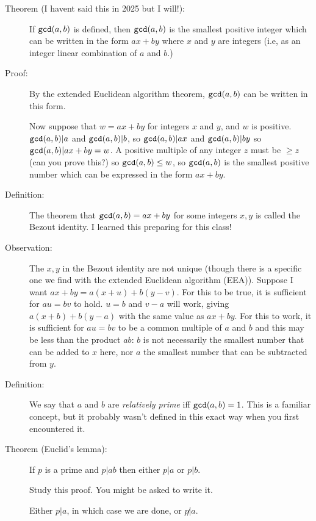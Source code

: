 \documentclass[12pt]{article}
\begin{document}
\begin{description}

\item[Theorem (I havent said this in 2025 but I will!):]  If ${\tt gcd}(a,b)$ is defined, then ${\tt gcd}(a,b)$ is the smallest positive integer which can be written in the form $ax+by$ where $x$ and $y$ are integers (i.e, as an integer linear combination of $a$ and $b$.)

\item[Proof:]  By the extended Euclidean algorithm theorem, ${\tt gcd}(a,b)$ can be written in this form.

Now suppose that $w=ax+by$ for integers $x$ and $y$, and $w$ is positive.  ${\tt gcd}(a,b)|a$ and ${\tt gcd}(a,b)|b$, so ${\tt gcd}(a,b)|ax$ and ${\tt gcd}(a,b)|by$ so ${\tt gcd}(a,b)|ax+by=w$.  A positive multiple of any integer $z$ must be $\geq z$ (can you prove this?) so ${\tt gcd}(a,b)\leq w$, so ${\tt gcd}(a,b)$ is the smallest positive number which can be expressed in the form $ax+by$.

\item[Definition:]  The theorem that ${\tt gcd}(a,b)=ax+by$ for some integers $x,y$ is called the Bezout identity.  I learned this preparing for this class!

\item[Observation:]  The $x,y$ in the Bezout identity are not unique (though there is a specific one we find with the extended Euclidean algorithm (EEA)).  Suppose I want $ax+by = a(x+u) + b(y-v)$.  For this to be true, it is sufficient for $au=bv$ to hold.  $u=b$ and $v-a$ will work, giving
$a(x+b) + b(y-a)$ with the same value as $ax+by$.  For this to work, it is sufficient for $au=bv$ to be a common multiple of $a$ and $b$ and this may be less than the product $ab$:  $b$ is not necessarily the smallest number that can be added to $x$ here, nor $a$ the smallest number that can be subtracted from $y$.

\item[Definition:]  We say that $a$ and $b$ are {\em relatively prime\/} iff ${\tt gcd}(a,b)=1$.  This is a familiar concept, but it probably wasn't defined in this exact way when you first encountered it.

\item[Theorem (Euclid's lemma):]  If $p$ is a prime and $p|ab$ then either $p|a$ or $p|b$.

Study this proof.  You might be asked to write it.

Either $p|a$, in which case we are done, or $p\not|a$.  


\end{description}
\end{document}
